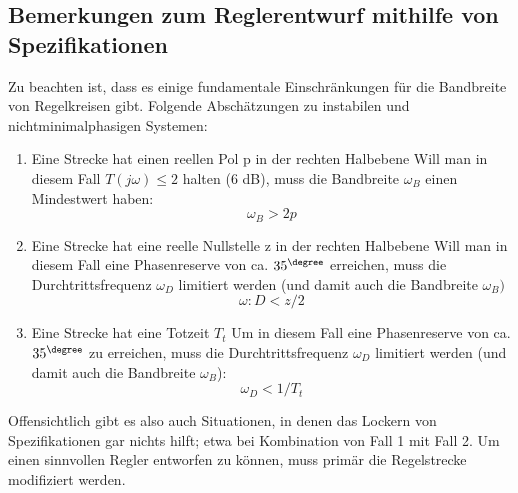 \subsection{Bemerkungen zum Reglerentwurf mithilfe von Spezifikationen}

Zu beachten ist, dass es einige fundamentale Einschränkungen für die Bandbreite
von Regelkreisen gibt. Folgende Abschätzungen zu
instabilen und nichtminimalphasigen Systemen:
\begin{enumerate}
\item Eine Strecke hat einen reellen Pol p in der rechten Halbebene
Will man in diesem Fall $T(j\omega) \leq 2$ halten (6 dB), muss die Bandbreite $\omega_B$
einen Mindestwert haben:
\[\omega_B > 2p\]
\item Eine Strecke hat eine reelle Nullstelle z in der rechten Halbebene
Will man in diesem Fall eine Phasenreserve von ca. $35^{\degree}$ erreichen, muss die
Durchtrittsfrequenz $\omega_D$ limitiert werden (und damit auch die Bandbreite $\omega_B)$ \[\omega:D < z/2\]
\item Eine Strecke hat eine Totzeit $T_t$
Um in diesem Fall eine Phasenreserve von ca. $35^{\degree}$ zu erreichen, muss die Durchtrittsfrequenz
$\omega_D$ limitiert werden (und damit auch die Bandbreite $\omega_B$):
\[\omega_D < 1/T_t\]
\end{enumerate}
Offensichtlich gibt es also auch Situationen, in denen das Lockern von Spezifikationen
gar nichts hilft; etwa bei Kombination von Fall 1 mit Fall 2. Um einen sinnvollen
Regler entworfen zu können, muss primär die Regelstrecke modifiziert werden.
